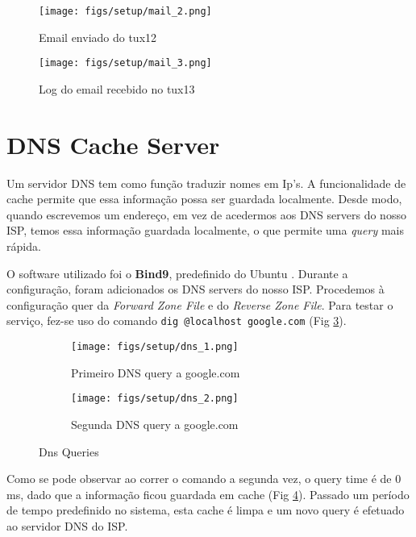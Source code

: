 \begin{figure}
    \centering
    \texttt{[image: figs/setup/mail\_2.png]}
    \caption{Email enviado do tux12}
    \label{fig:webmail_2}
\end{figure}

\begin{figure}
    \centering
    \texttt{[image: figs/setup/mail\_3.png]}
    \caption{Log do email recebido no tux13}
    \label{fig:webmail_3}
\end{figure}

\section{DNS Cache Server}

Um servidor DNS tem como função traduzir nomes em Ip's. A funcionalidade de cache permite que essa informação possa ser guardada localmente.
Desde modo, quando escrevemos um endereço, em vez de acedermos aos DNS servers do nosso ISP, temos essa informação guardada localmente, o que permite uma \textit{query} mais rápida.

O software utilizado foi o \textbf{Bind9}, predefinido do Ubuntu \cite{dns}.
Durante a configuração, foram adicionados os DNS servers do nosso ISP.
Procedemos à configuração quer da \textit{Forward Zone File} e do \textit{Reverse Zone File}.
Para testar o serviço, fez-se uso do comando \verb|dig @localhost google.com| (Fig \ref{fig:dns_1}).

\begin{figure}
    \centering
    \begin{subfigure}{.5\textwidth}
      \centering
      \texttt{[image: figs/setup/dns\_1.png]}
      \caption{Primeiro DNS query a google.com}
      \label{fig:dns_1}
    \end{subfigure}%
    \begin{subfigure}{.5\textwidth}
      \centering
      \texttt{[image: figs/setup/dns\_2.png]}
      \caption{Segunda DNS query a google.com}
      \label{fig:dns_2}
    \end{subfigure}
    \caption{Dns Queries}
    \label{fig:dns}
\end{figure}

Como se pode observar ao correr o comando a segunda vez, o query time é de 0 ms, dado que a informação ficou guardada em cache (Fig \ref{fig:dns_2}).
Passado um período de tempo predefinido no sistema, esta cache é limpa e um novo query é efetuado ao servidor DNS do ISP.





